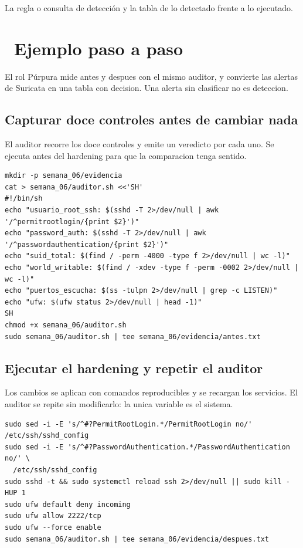 \documentclass[11pt,a4paper]{article}
\newcommand{\iconotexto}[2]{\textcolor{cyanNeon}{\faIcon{#1}}~#2}
\begin{document}
La regla o consulta de detección y la tabla de lo detectado frente a lo ejecutado.

\section{\iconotexto{list-ol}{Ejemplo paso a paso}}

El rol Púrpura mide antes y despues con el mismo auditor, y convierte las alertas de Suricata en una tabla con decision. Una alerta sin clasificar no es deteccion.

\subsection{Capturar doce controles antes de cambiar nada}

El auditor recorre los doce controles y emite un veredicto por cada uno. Se ejecuta antes del hardening para que la comparacion tenga sentido.

\begin{lstlisting}[style=estiloCodigo]
mkdir -p semana_06/evidencia
cat > semana_06/auditor.sh <<'SH'
#!/bin/sh
echo "usuario_root_ssh: $(sshd -T 2>/dev/null | awk '/^permitrootlogin/{print $2}')"
echo "password_auth: $(sshd -T 2>/dev/null | awk '/^passwordauthentication/{print $2}')"
echo "suid_total: $(find / -perm -4000 -type f 2>/dev/null | wc -l)"
echo "world_writable: $(find / -xdev -type f -perm -0002 2>/dev/null | wc -l)"
echo "puertos_escucha: $(ss -tulpn 2>/dev/null | grep -c LISTEN)"
echo "ufw: $(ufw status 2>/dev/null | head -1)"
SH
chmod +x semana_06/auditor.sh
sudo semana_06/auditor.sh | tee semana_06/evidencia/antes.txt
\end{lstlisting}

\subsection{Ejecutar el hardening y repetir el auditor}

Los cambios se aplican con comandos reproducibles y se recargan los servicios. El auditor se repite sin modificarlo: la unica variable es el sistema.

\begin{lstlisting}[style=estiloCodigo]
sudo sed -i -E 's/^#?PermitRootLogin.*/PermitRootLogin no/' /etc/ssh/sshd_config
sudo sed -i -E 's/^#?PasswordAuthentication.*/PasswordAuthentication no/' \
  /etc/ssh/sshd_config
sudo sshd -t && sudo systemctl reload ssh 2>/dev/null || sudo kill -HUP 1
sudo ufw default deny incoming
sudo ufw allow 2222/tcp
sudo ufw --force enable
sudo semana_06/auditor.sh | tee semana_06/evidencia/despues.txt
\end{lstlisting}
\end{document}
